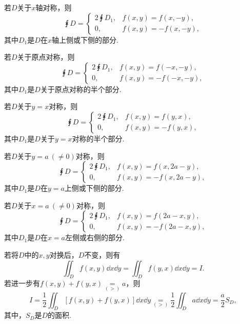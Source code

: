 若\(D\)关于\(x\)轴对称，则\[
\intx{D} = \left\{ \begin{array}{cc}
2 \intx{D_1}, & f(x,y) = f(x,-y), \\
0, & f(x,y) = -f(x,-y),
\end{array} \right.
\]其中\(D_1\)是\(D\)在\(x\)轴上侧或下侧的部分.

若\(D\)关于原点对称，则\[
\intx{D} = \left\{ \begin{array}{cc}
2 \intx{D_1}, & f(x,y) = f(-x,-y), \\
0, & f(x,y) = -f(-x,-y),
\end{array} \right.
\]其中\(D_1\)是\(D\)关于原点对称的半个部分.

若\(D\)关于\(y=x\)对称，则\[
\intx{D} = \left\{ \begin{array}{cc}
2 \intx{D_1}, & f(x,y) = f(y,x), \\
0, & f(x,y) = -f(y,x),
\end{array} \right.
\]其中\(D_1\)是\(D\)关于\(y=x\)对称的半个部分.

若\(D\)关于\(y=a\ (\neq0)\)对称，则\[
\intx{D} = \left\{ \begin{array}{cc}
2 \intx{D_1}, & f(x,y) = f(x,2a-y), \\
0, & f(x,y) = -f(x,2a-y),
\end{array} \right.
\]其中\(D_1\)是\(D\)在\(y=a\)上侧或下侧的部分.

若\(D\)关于\(x=a\ (\neq0)\)对称，则\[
\intx{D} = \left\{ \begin{array}{cc}
2 \intx{D_1}, & f(x,y) = f(2a-x,y), \\
0, & f(x,y) = -f(2a-x,y),
\end{array} \right.
\]其中\(D_1\)是\(D\)在\(x=a\)左侧或右侧的部分.

\def\op{\underset{(>)}{=}}
若将\(D\)中的\(x,y\)对换后，\(D\)不变，则有\[
\iint_D f(x,y) \dd{x}\dd{y} = \iint_D f(y,x) \dd{x}\dd{y} = I.
\]若进一步有\(f(x,y)+f(y,x) \op a\)，则\[
I = \frac{1}{2} \iint_D [ f(x,y) + f(y,x) ] \dd{x}\dd{y}
\op \frac{1}{2} \iint_D a \dd{x}\dd{y}
= \frac{a}{2} S_D,
\]其中，\(S_D\)是\(D\)的面积.
\endgroup

